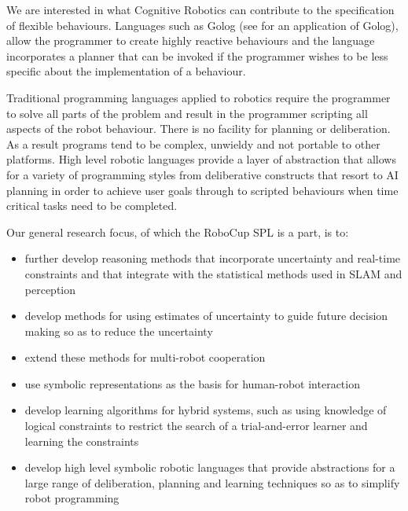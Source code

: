 \documentclass[pdftex,11pt,a4paper]{report}
\begin{document}
We are interested in what Cognitive Robotics can contribute to the specification of flexible behaviours. Languages such as Golog (see \cite{Levesque00legolog:inexpensive} for an application of Golog), allow the programmer to create highly reactive behaviours and the language incorporates a planner that can be invoked if the programmer wishes to be less specific about the implementation of a behaviour. 

Traditional programming languages applied to robotics require the programmer to solve all parts of the problem and result in the programmer scripting all aspects of the robot behaviour. There is no facility for planning or deliberation. As a result programs tend to be complex, unwieldy and not portable to other platforms. High level robotic languages provide a layer of abstraction that allows for a variety of programming styles from deliberative constructs that resort to AI planning in order to achieve user goals through to scripted behaviours when time critical tasks need to be completed.

Our general research focus, of which the RoboCup SPL is a part, is to:
\begin{itemize}
\item further develop reasoning methods that incorporate uncertainty and real-time constraints and that integrate with the statistical methods used in SLAM and perception
\item develop methods for using estimates of uncertainty to guide future decision making so as to reduce the uncertainty 
\item extend these methods for multi-robot cooperation
\item use symbolic representations as the basis for human-robot interaction
\item develop learning algorithms for hybrid systems, such as using knowledge of logical constraints to restrict the search of a trial-and-error learner and learning the constraints
\item develop high level symbolic robotic languages that provide abstractions for a large range of deliberation, planning and learning techniques so as to simplify robot programming
\end{itemize}
\end{document}

